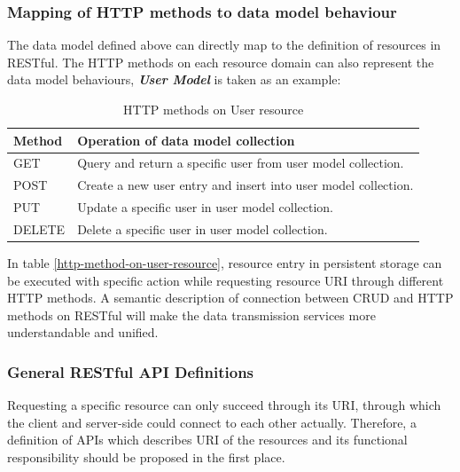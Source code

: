 \subsubsection{ Mapping of HTTP methods to data model behaviour }
The data model defined above can directly map to the definition of resources in RESTful. The HTTP methods on each resource domain can also represent the data model behaviours, \textbf{\textit{User Model}} is taken as an example: 
\begin{table}[!htbp]
\centering
\begin{tabularx}{\textwidth}{@{}lX@{}}
\toprule
Method        & {Operation of data model collection }                            \\ \midrule
GET           & {Query and return a specific user from user model collection.}   \\
POST          & {Create a new user entry and insert into user model collection.} \\
PUT           & {Update a specific user in user model collection.}               \\
DELETE        & {Delete a specific user in user model collection.}               \\ \bottomrule
\end{tabularx}
\caption{HTTP methods on User resource}
\label{table:http-method-on-user-resource}
\end{table}

In table \ref{http-method-on-user-resource}, resource entry in persistent storage can be executed with specific action while requesting resource URI through different HTTP methods. A semantic description of connection between \gls{CRUD} and HTTP methods on RESTful will make the data transmission services more understandable and unified.

\subsubsection{ General RESTful API Definitions }

Requesting a specific resource can only succeed through its \gls{URI}, through which the client and server-side could connect to each other actually. Therefore, a definition of APIs which describes \gls{URI} of the resources and its functional responsibility should be proposed in the first place.



